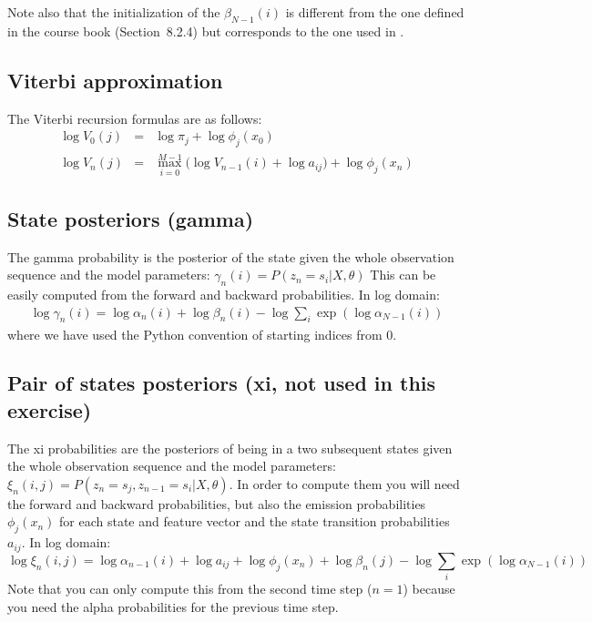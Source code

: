\documentclass{nada-ten}
\begin{document}
Note also that the initialization of the $\beta_{N-1}(i)$ is different from the one defined in the course book \cite{gs:HuangEtAl2001Book} (Section~8.2.4) but corresponds to the one used in \cite{gs:Rabiner1989}.

\subsection{Viterbi approximation}
The Viterbi recursion formulas are as follows:
\begin{eqnarray*}
  \log V_0(j) &=& \log\pi_j + \log\phi_j(x_0) \\
  \log V_n(j) &=& \max_{i=0}^{M-1} \Big(\log V_{n-1}(i) + \log a_{ij}\Big) + \log\phi_j(x_n)
\end{eqnarray*}

\subsection{State posteriors (gamma)}
The gamma probability is the posterior of the state given the whole observation sequence and the model parameters:
$\gamma_n(i) = P(z_n=s_i|X,\theta)$
This can be easily computed from the forward and backward probabilities. In log domain:
\begin{align*}
  \log\gamma_n(i) = \log\alpha_n(i) + \log\beta_n(i) - \log\sum_i\exp\left(\log\alpha_{N-1}(i)\right)
\end{align*}
where we have used the Python convention of starting indices from 0.
\subsection{Pair of states posteriors (xi, not used in this exercise)}
The xi probabilities are the posteriors of being in a two subsequent states given the whole observation sequence and the model parameters: $\xi_n(i,j) = P(z_n=s_j,z_{n-1}=s_i|X,\theta) $. In order to compute them you will need the forward and backward probabilities, but also the emission probabilities $\phi_j(x_n)$ for each state and feature vector and the state transition probabilities $a_{ij}$. In log domain:
\begin{equation}\nonumber
\log\xi_n(i,j) = \log\alpha_{n-1}(i) + \log a_{ij} + \log\phi_j(x_n) + \log\beta_n(j) - \log\sum_i\exp\left(\log\alpha_{N-1}(i)\right)
\end{equation}
Note that you can only compute this from the second time step ($n=1$) because you need the alpha probabilities for the previous time step.

\printbibliography
\end{document}
